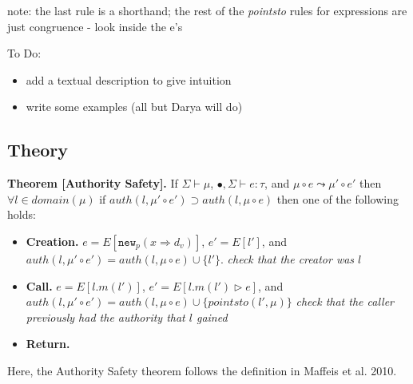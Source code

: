 \documentclass{llncs}
\newcommand{\keywadj}[1]{\mathtt{#1}}
\newcommand{\stepsto}{\leadsto}
\begin{document}
note: the last rule is a shorthand; the rest of the \textit{pointsto} rules for expressions are just congruence - look inside the e's

To Do:

\begin{itemize}
\item add a textual description to give intuition
\item write some examples (all but Darya will do)
\end{itemize}

\newpage

\subsection{Theory}

\textbf{Theorem [Authority Safety].}  If $\Sigma \vdash \mu$, $\bullet, \Sigma \vdash e : \tau$, and $\mu \circ e \stepsto \mu' \circ e'$ then $\forall l \in domain(\mu)$ if $auth(l,\mu' \circ e') \supset auth(l,\mu \circ e)$ then one of the following holds:

\begin{itemize}
  \item \textbf{Creation.} $e = E[\keywadj{new}_p(x \Rightarrow d_v)]$, $e' = E[l']$, and $auth(l,\mu' \circ e') = auth(l,\mu \circ e) \cup \{ l' \}$.  \textit{check that the creator was $l$}
  \item \textbf{Call.} $e = E[l.m(l')]$, $e' = E[l.m(l') \rhd e]$, and $auth(l,\mu' \circ e') = auth(l,\mu \circ e) \cup \{ pointsto(l',\mu) \}$  \textit{check that the caller previously had the authority that $l$ gained}
  \item \textbf{Return.}
\end{itemize}

Here, the Authority Safety theorem follows the definition in Maffeis et al. 2010.
\end{document}
